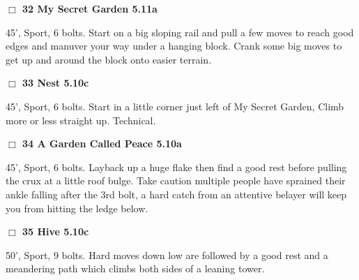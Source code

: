 \begin{multicols}{2}
\needspace{2em}
\label{rt:My Secret Garden}
\colorbox{RoyalBlue!20}{
\parbox{0.95\linewidth}{
\hspace{-1ex}\textbf{$\Box$
32 My Secret Garden 5.11a  
}}}
\begin{adjustwidth}{1.3em}{}			

45', Sport, 6 bolts. Start on a big sloping rail and pull a few moves to reach good edges and manuver your way under a hanging block. Crank some big moves to get up and around the block onto easier terrain.
\end{adjustwidth}




\needspace{2em}
\label{rt:Nest}
\colorbox{RoyalBlue!20}{
\parbox{0.95\linewidth}{
\hspace{-1ex}\textbf{$\Box$
33 Nest 5.10c  
}}}
\begin{adjustwidth}{1.3em}{}			

45', Sport, 6 bolts. Start in a little corner just left of My Secret Garden, Climb more or less straight up. Technical.
\end{adjustwidth}




\needspace{2em}
\label{rt:A Garden Called Peace}
\colorbox{RoyalBlue!20}{
\parbox{0.95\linewidth}{
\hspace{-1ex}\textbf{$\Box$
34 A Garden Called Peace 5.10a  
}}}
\begin{adjustwidth}{1.3em}{}			

45', Sport, 6 bolts. Layback up a huge flake then find a good rest before pulling the crux at a little roof bulge. Take caution multiple people have sprained their ankle falling after the 3rd bolt, a hard catch from an attentive belayer will keep you from hitting the ledge below.
\end{adjustwidth}




\needspace{2em}
\label{rt:Hive}
\colorbox{RoyalBlue!20}{
\parbox{0.95\linewidth}{
\hspace{-1ex}\textbf{$\Box$
35 Hive 5.10c  
}}}
\begin{adjustwidth}{1.3em}{}			

50', Sport, 9 bolts. Hard moves down low are followed by a good rest and a meandering path which climbs both sides of a leaning tower.
\end{adjustwidth}




	\end{multicols}


